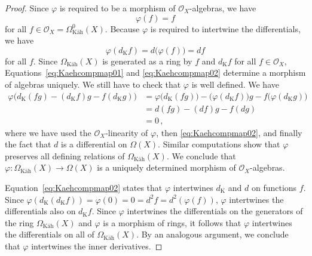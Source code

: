 \documentclass[12pt,reqno, a4paper]{amsart}
\numberwithin{equation}{section}
\theoremstyle{plain}
\theoremstyle{definition}
\theoremstyle{remark}
\newcommand{\calO}{\mathcal{O}}
\newcommand{\Val}{\eta}
\renewcommand{\phi}{\varphi}
\begin{document}
\begin{proof}
Since $\phi$ is required to be a morphism of $\calO_X$-algebras, we have
\begin{equation}
\label{eq:Kaehcompmap01}
  \phi(f) = f
\end{equation}
for all $f \in \calO_X = \Omega^0_\text{K\"ah}(X)$. Because $\phi$ is required to intertwine the differentials, we have
\begin{equation}
\label{eq:Kaehcompmap02}
  \phi(d_\mathrm{K}f)
  = d \bigl( \phi(f) \bigr)
  = df
\end{equation}
for all $f$. Since $\Omega_\text{K\"ah}(X)$ is generated as a ring by $f$ and $d_\mathrm{K}f$ for all $f \in \calO_X$, Equations~\eqref{eq:Kaehcompmap01} and \eqref{eq:Kaehcompmap02} determine a morphism of algebras uniquely. We still have to check that $\phi$ is well defined. We have
\begin{equation*}
\begin{split}
  \phi\bigl( d_\mathrm{K}(fg) - (d_\mathrm{K}f)g - f(d_\mathrm{K}g) \bigr)
  &=
  \phi\bigl( d_\mathrm{K}(fg) \bigr)
  - \bigl(\phi(d_\mathrm{K}f)\bigr) g
  - f\bigl(\phi(d_\mathrm{K}g) \bigr)
  \\
  &=
  d(fg) - (df) g - f(dg)
  \\
  &= 0
  \,,
\end{split}
\end{equation*}
where we have used the $\calO_X$-linearity of $\phi$, then \eqref{eq:Kaehcompmap02}, and finally the fact that $d$ is a differential on $\Omega(X)$. Similar computations show that $\phi$ preserves all defining relations of $\Omega_\text{K\"ah}(X)$. We conclude that $\phi:\Omega_\text{K\"ah}(X) \to \Omega(X)$ is a uniquely determined morphism of $\calO_X$-algebras.

Equation~\eqref{eq:Kaehcompmap02} states that $\phi$ intertwines $d_\mathrm{K}$ and $d$ on functions $f$. Since $\phi(d_\mathrm{K}(d_\mathrm{K}f)) = \phi(0) = 0 = d^2 f = d^2(\phi(f))$, $\phi$ intertwines the differentials also on $d_\mathrm{K}f$. Since $\phi$ intertwines the differentials on the generators of the ring $\Omega_\text{K\"ah}(X)$ and $\phi$ is a morphism of rings, it follows that $\phi$ intertwines the differentials on all of $\Omega_\text{K\"ah}(X)$. By an analogous argument, we conclude that $\phi$ intertwines the inner derivatives.
\end{proof}

\end{document}
